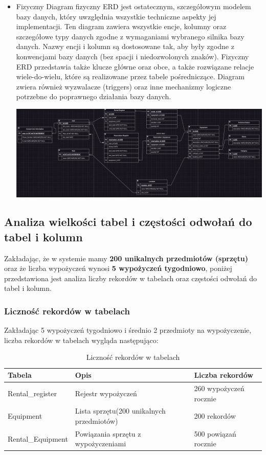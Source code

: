 \documentclass{article}
\begin{document}
\begin{itemize}
    \item Fizyczny
        Diagram fizyczny ERD jest ostatecznym, szczegółowym modelem bazy danych, który uwzględnia wszystkie techniczne aspekty jej implementacji. Ten diagram zawiera wszystkie encje, kolumny oraz szczegółowe typy danych zgodne z wymaganiami wybranego silnika bazy danych. Nazwy encji i kolumn są dostosowane tak, aby były zgodne z konwencjami bazy danych (bez spacji i niedozwolonych znaków). Fizyczny ERD przedstawia także klucze główne oraz obce, a także rozwiązane relacje wiele-do-wielu, które są realizowane przez tabele pośredniczące. Diagram zwiera również  wyzwalacze (triggers) oraz inne mechanizmy logiczne potrzebne do poprawnego działania bazy danych.

      \includegraphics[width=\textwidth]{media/physical_erd.png}

  \end{itemize}

\subsection{\textbf{Analiza wielkości tabel i częstości odwołań do tabel i kolumn}}

Zakładając, że w systemie mamy \textbf{200 unikalnych przedmiotów (sprzętu)} oraz że liczba wypożyczeń wynosi \textbf{5 wypożyczeń tygodniowo}, poniżej przedstawiona jest analiza liczby rekordów w tabelach oraz częstości odwołań do tabel i kolumn.

\subsubsection{Liczność rekordów w tabelach}
Zakładając 5 wypożyczeń tygodniowo i średnio 2 przedmioty na wypożyczenie, liczba rekordów w tabelach wygląda następująco:

\begin{table}[h!]
    \centering
        \begin{tabular}{|l|l|l|}
            \hline
            \textbf{Tabela} & \textbf{Opis}  & \textbf{Liczba rekordów} \\ \hline
            Rental\_register & Rejestr wypożyczeń & 260 wypożyczeń rocznie \\ \hline
            Equipment & Lista sprzętu(200 unikalnych przedmiotów) & 200 rekordów \\ \hline
            Rental\_Equipment & Powiązania sprzętu z wypożyczeniami & 500 powiązań rocznie \\ \hline
        \end{tabular}
    \caption{Liczność rekordów w tabelach}
\end{table}
\end{document}
